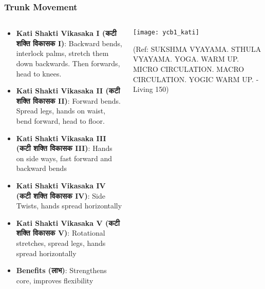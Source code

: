 \begin{frame}[fragile]\frametitle{Trunk Movement}
\begin{columns}
    \begin{column}[T]{0.5\linewidth}
      \begin{itemize}
		\item \textbf{Kati Shakti Vikasaka I (कटी शक्ति विकासक I)}: Backward bends, interlock palms, stretch them down backwards. Then forwards, head to knees.
		\item \textbf{Kati Shakti Vikasaka II (कटी शक्ति विकासक II)}: Forward bends. Spread legs, hands on waist, bend forward, head to floor.
		\item \textbf{Kati Shakti Vikasaka III (कटी शक्ति विकासक III)}: Hands on side ways, fast forward and backward bends
		\item \textbf{Kati Shakti Vikasaka IV (कटी शक्ति विकासक IV)}: Side Twists, hands spread horizontally
		\item \textbf{Kati Shakti Vikasaka V (कटी शक्ति विकासक V)}: Rotational stretches, spread legs, hands spread horizontally
		\item \textbf{Benefits (लाभ)}: Strengthens core, improves flexibility
	  \end{itemize}
    \end{column}
    \begin{column}[T]{0.5\linewidth}
		\begin{center}
		        \texttt{[image: ycb1\_kati]}
				
				{\tiny (Ref: SUKSHMA VYAYAMA. STHULA VYAYAMA. YOGA. WARM UP. MICRO CIRCULATION. MACRO CIRCULATION. YOGIC WARM UP. - Living 150)}	
		\end{center}	
    \end{column}
\end{columns}
\end{frame}

